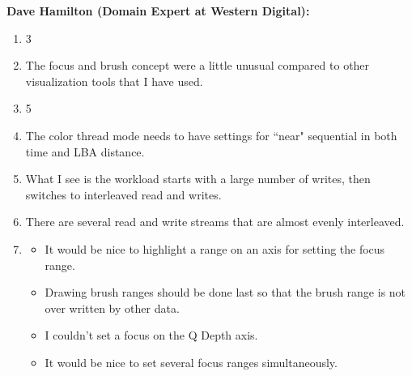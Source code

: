 \documentclass[12pt]{ucthesis}
\begin{document}
\textbf{Dave Hamilton (Domain Expert at Western Digital):}
\begin{enumerate}
\item 3
\item The focus and brush concept were a little unusual compared to other visualization tools that I have used.
\item 5
\item The color thread mode needs to have settings for ``near" sequential in both time and LBA distance.
\item What I see is the workload starts with a large number of writes, then switches to interleaved read and writes.
\item There are several read and write streams that are almost evenly interleaved.
\item
\begin{itemize}
\item It would be nice to highlight a range on an axis for setting the focus range.
\item Drawing brush ranges should be done last so that the brush range is not over written by other data.
\item I couldn't set a focus on the Q Depth axis.
\item It would be nice to set several focus ranges simultaneously.
\end{itemize}
\end{enumerate}
\end{document}
